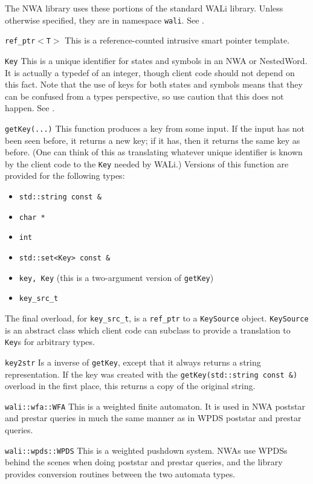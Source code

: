 The NWA library uses these portions of the standard WALi library. Unless
otherwise specified, they are in namespace \texttt{wali}. See \cite{wali}.

\begin{description}
  \item\texttt{ref\_ptr$<$T$>$} This is a reference-counted intrusive smart
    pointer template.
  \item\texttt{Key} This is a unique identifier for states and symbols in an
    NWA or NestedWord. It is actually a typedef of an integer, though client
    code should not depend on this fact. Note that the use of keys for both
    states and symbols means that they can be confused from a types
    perspective, so use caution that this does not happen. See \cite{wali}.
  \item\texttt{getKey(...)} This function produces a key from some input. If
    the input has not been seen before, it returns a new key; if it has, then
    it returns the same key as before. (One can think of this as translating
    whatever unique identifier is known by the client code to the
    \texttt{Key} needed by WALi.) Versions of this function are provided for
    the following types:
    \begin{itemize}
      \item \texttt{std::string const \&}
      \item \texttt{char *}
      \item \texttt{int}
      \item \texttt{std::set<Key> const \&}
      \item \texttt{key, Key} (this is a two-argument version of
        \texttt{getKey})
      \item \texttt{key\_src\_t}
    \end{itemize}

    The final overload, for \texttt{key\_src\_t}, is a \texttt{ref\_ptr} to a
    \texttt{KeySource} object. \texttt{KeySource} is an abstract class which
    client code can subclass to provide a translation to \texttt{Key}s for
    arbitrary types.
  \item\texttt{key2str} Is a inverse of \texttt{getKey}, except that it
    always returns a string representation. If the key was created with the
    \texttt{getKey(std::string const \&)} overload in the first place, this
    returns a copy of the original string.
  \item\texttt{wali::wfa::WFA} This is a weighted finite automaton. It is
    used in NWA poststar and prestar queries in much the same manner as in
    WPDS poststar and prestar queries.
  \item\texttt{wali::wpds::WPDS} This is a weighted pushdown system. NWAs use
    WPDSs behind the scenes when doing poststar and prestar queries, and the
    library provides conversion routines between the two automata types.
\end{description}


